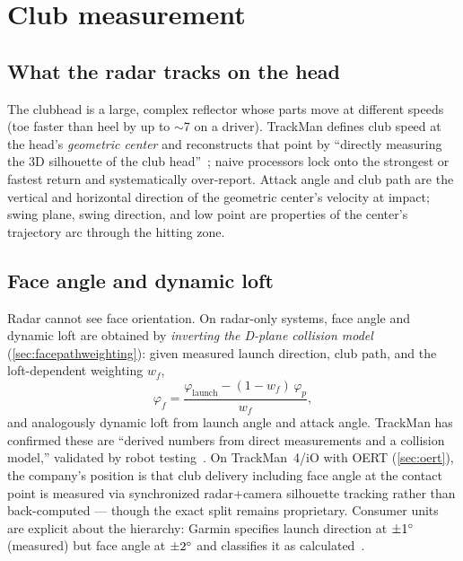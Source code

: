 \section{Club measurement}
\label{sec:radarclub}

\subsection{What the radar tracks on the head}

The clubhead is a large, complex reflector whose parts move at different
speeds (toe faster than heel by up to $\sim$7\mph{} on a driver). TrackMan
defines club speed at the head's \emph{geometric center} and reconstructs
that point by ``directly measuring the 3D silhouette of the club
head''~\cite{trackmanclubspeed}; naive processors lock onto the strongest
or fastest return and systematically over-report. Attack angle and club
path are the vertical and horizontal direction of the geometric center's
velocity at impact; swing plane, swing direction, and low point are
properties of the center's trajectory arc through the hitting zone.

\subsection{Face angle and dynamic loft}
\label{sec:faceangle}

Radar cannot see face orientation. On radar-only systems, face angle and
dynamic loft are obtained by \emph{inverting the D-plane collision model}
(\cref{sec:facepathweighting}): given measured launch direction, club
path, and the loft-dependent weighting $w_f$,
\begin{equation}
\label{eq:faceinversion}
\varphi_f = \frac{\varphi_{\mathrm{launch}} - (1-w_f)\,\varphi_p}{w_f},
\end{equation}
and analogously dynamic loft from launch angle and attack angle. TrackMan
has confirmed these are ``derived numbers from direct measurements and a
collision model,'' validated by robot testing~\cite{manzellaforum}. On
TrackMan~4/iO with OERT (\cref{sec:oert}), the company's position is that
club delivery including face angle at the contact point is measured via
synchronized radar+camera silhouette tracking rather than back-computed
--- though the exact split remains proprietary. Consumer units are
explicit about the hierarchy: Garmin specifies launch direction at
$\pm1\si{\degree}$ (measured) but face angle at $\pm2\si{\degree}$ and classifies it as
calculated~\cite{garminr10accuracy}.

